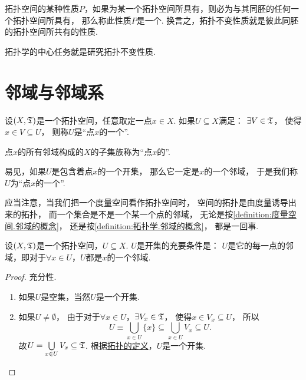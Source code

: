 拓扑空间的某种性质\(P\)，如果为某一个拓扑空间所具有，则必为与其同胚的任何一个拓扑空间所具有，
那么称此性质\(P\)是一个.
换言之，拓扑不变性质就是彼此同胚的拓扑空间所共有的性质.

{\color{red} 拓扑学的中心任务就是研究拓扑不变性质.}

\section{邻域与邻域系}
\begin{definition}\label{definition:拓扑学.邻域的概念}
设\((X,\mathfrak T)\)是一个拓扑空间，任意取定一点\(x \in X\).
如果\(U \subseteq X\)满足：
\(\exists V \in \mathfrak T\)，
使得\(x \in V \subseteq U\)，
则称\(U\)是“点\(x\)的一个”.

点\(x\)的所有邻域构成的\(X\)的子集族称为“点\(x\)的”.
\end{definition}

易见，如果\(U\)是包含着点\(x\)的一个开集，
那么它一定是\(x\)的一个邻域，
于是我们称\(U\)为“点\(x\)的一个”.

应当注意，当我们把一个度量空间看作拓扑空间时，
空间的拓扑是由度量诱导出来的拓扑，
而一个集合是不是一个某一个点的邻域，
无论是按\cref{definition:度量空间.邻域的概念}，
还是按\cref{definition:拓扑学.邻域的概念}，
都是一回事.

\begin{theorem}\label{theorem:拓扑学.成为开集的充要条件1}
设\((X,\mathfrak T)\)是一个拓扑空间，\(U \subseteq X\).
\(U\)是开集的充要条件是：
\(U\)是它的每一点的邻域，即对于\(\forall x \in U\)，\(U\)都是\(x\)的一个邻域.
\begin{proof}
充分性.
\begin{enumerate}
	\item 如果\(U\)是空集，当然\(U\)是一个开集.

	\item 如果\(U\neq\emptyset\)，
	由于对于\(\forall x \in U\)，\(\exists V_x \in \mathfrak T\)，
	使得\(x \in V_x \subseteq U\)，
	所以\[
	U \equiv \bigcup\limits_{x \in U} \{ x \}
	\subseteq \bigcup\limits_{x \in U} V_x
	\subseteq U.
	\]
	故\(U = \bigcup\limits_{x \in U} V_x \subseteq \mathfrak T\).
	根据\hyperref[definition:拓扑学.开集公理定义的拓扑空间]{拓扑的定义}，\(U\)是一个开集.
	\qedhere
\end{enumerate}
\end{proof}
\end{theorem}

